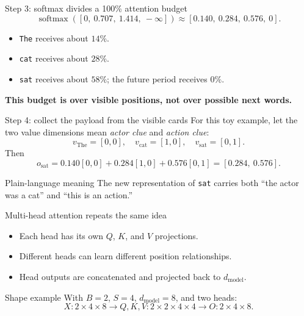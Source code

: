 \documentclass[aspectratio=169,11pt]{beamer}
\newcommand{\key}[1]{\textcolor{HUSTDeep}{\textbf{#1}}}
\begin{document}
\begin{frame}{Step 3: softmax divides a 100\% attention budget}
  \[
    \operatorname{softmax}
    ([0,\ 0.707,\ 1.414,\ -\infty])
    \approx
    [0.140,\ 0.284,\ 0.576,\ 0].
  \]
  \begin{itemize}
    \item \texttt{The} receives about \(14\%\).
    \item \texttt{cat} receives about \(28\%\).
    \item \texttt{sat} receives about \(58\%\); the future period receives \(0\%\).
  \end{itemize}
  \vspace{0.25cm}
  \key{This budget is over visible positions, not over possible next words.}
\end{frame}

\begin{frame}{Step 4: collect the payload from the visible cards}
  For this toy example, let the two value dimensions mean
  \textit{actor clue} and \textit{action clue}:
  \[
    v_{\text{The}}=[0,0],\quad
    v_{\text{cat}}=[1,0],\quad
    v_{\text{sat}}=[0,1].
  \]
  Then
  \[
    o_{\text{sat}}
    =0.140[0,0]+0.284[1,0]+0.576[0,1]
    =[0.284,\ 0.576].
  \]
  \begin{block}{Plain-language meaning}
    The new representation of \texttt{sat} carries both ``the actor was a cat'' and ``this is an action.''
  \end{block}
\end{frame}

\begin{frame}{Multi-head attention repeats the same idea}
  \begin{itemize}
    \item Each head has its own \(Q\), \(K\), and \(V\) projections.
    \item Different heads can learn different position relationships.
    \item Head outputs are concatenated and projected back to \(d_{\text{model}}\).
  \end{itemize}
  \vspace{0.25cm}
  \begin{block}{Shape example}
    With \(B=2\), \(S=4\), \(d_{\text{model}}=8\), and two heads:
    \[
      X:2\times4\times8
      \rightarrow
      Q,K,V:2\times2\times4\times4
      \rightarrow
      O:2\times4\times8.
    \]
  \end{block}
\end{frame}
\end{document}
